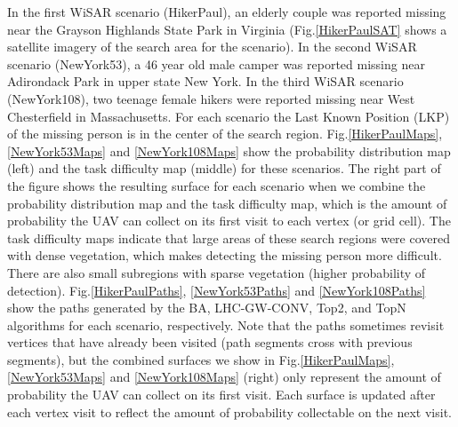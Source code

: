 \documentclass[journal]{IEEEtran}
\begin{document}
In the first WiSAR scenario (HikerPaul), an elderly couple was reported missing near the Grayson Highlands State Park in Virginia (Fig.\ref{HikerPaulSAT} shows a satellite imagery of the search area for the scenario). In the second WiSAR scenario (NewYork53), a 46 year old male camper was reported missing near Adirondack Park in upper state New York. In the third WiSAR scenario (NewYork108), two teenage female hikers were reported missing near West Chesterfield in Massachusetts. For each scenario the Last Known Position (LKP) of the missing person is in the center of the search region. Fig.\ref{HikerPaulMaps}, \ref{NewYork53Maps} and \ref{NewYork108Maps} show the probability distribution map (left) and the task difficulty map (middle) for these scenarios. The right part of the figure shows the resulting surface for each scenario when we combine the probability distribution map and the task difficulty map, which is the amount of probability the UAV can collect on its first visit to each vertex (or grid cell). The task difficulty maps indicate that large areas of these search regions were covered with dense vegetation, which makes detecting the missing person more difficult. There are also small subregions with sparse vegetation (higher probability of detection). Fig.\ref{HikerPaulPaths}, \ref{NewYork53Paths} and \ref{NewYork108Paths} show the paths generated by the BA, LHC-GW-CONV, Top2, and TopN algorithms for each scenario, respectively. Note that the paths sometimes revisit vertices that have already been visited (path segments cross with previous segments), but the combined surfaces we show in Fig.\ref{HikerPaulMaps}, \ref{NewYork53Maps} and \ref{NewYork108Maps} (right) only represent the amount of probability the UAV can collect on its first visit. Each surface is updated after each vertex visit to reflect the amount of probability collectable on the next visit.

\end{document}
